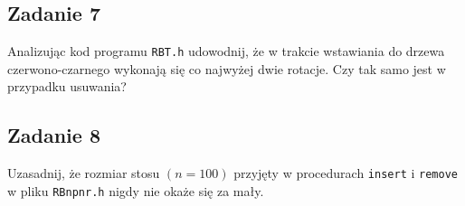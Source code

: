 \documentclass{article}
\begin{document}
\subsection*{Zadanie 7}
Analizując kod programu \verb+RBT.h+ udowodnij, że w trakcie wstawiania do drzewa czerwono-czarnego
wykonają się co najwyżej dwie rotacje. Czy tak samo jest w przypadku usuwania?

\subsection*{Zadanie 8}
Uzasadnij, że rozmiar stosu $(n = 100)$ przyjęty w procedurach \verb+insert+ i \verb+remove+ w pliku
\verb+RBnpnr.h+ nigdy nie okaże się za mały.
\end{document}
